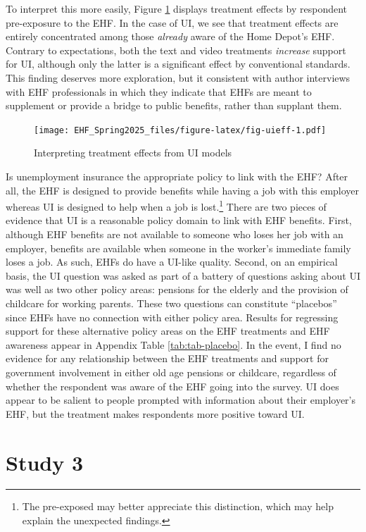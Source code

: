 \documentclass[
  11pt,
  oneside]{article}
\begin{document}
To interpret this more easily, Figure \ref{fig:fig-uieff} displays treatment effects by respondent pre-exposure to the EHF. In the case of UI, we see that treatment effects are entirely concentrated among those \emph{already} aware of the Home Depot's EHF. Contrary to expectations, both the text and video treatments \emph{increase} support for UI, although only the latter is a significant effect by conventional standards. This finding deserves more exploration, but it consistent with author interviews with EHF professionals in which they indicate that EHFs are meant to supplement or provide a bridge to public benefits, rather than supplant them.

\begin{figure}
\centering
\texttt{[image: EHF\_Spring2025\_files/figure-latex/fig-uieff-1.pdf]}
\caption{\label{fig:fig-uieff}Interpreting treatment effects from UI models}
\end{figure}

Is unemployment insurance the appropriate policy to link with the EHF? After all, the EHF is designed to provide benefits while having a job with this employer whereas UI is designed to help when a job is lost.\footnote{The pre-exposed may better appreciate this distinction, which may help explain the unexpected findings.} There are two pieces of evidence that UI is a reasonable policy domain to link with EHF benefits. First, although EHF benefits are not available to someone who loses her job with an employer, benefits are available when someone in the worker's immediate family loses a job. As such, EHFs do have a UI-like quality. Second, on an empirical basis, the UI question was asked as part of a battery of questions asking about UI was well as two other policy areas: pensions for the elderly and the provision of childcare for working parents. These two questions can constitute ``placebos'' since EHFs have no connection with either policy area. Results for regressing support for these alternative policy areas on the EHF treatments and EHF awareness appear in Appendix Table \ref{tab:tab-placebo}. In the event, I find no evidence for any relationship between the EHF treatments and support for government involvement in either old age pensions or childcare, regardless of whether the respondent was aware of the EHF going into the survey. UI does appear to be salient to people prompted with information about their employer's EHF, but the treatment makes respondents more positive toward UI.

\section{Study 3}\label{study-3}
\end{document}
